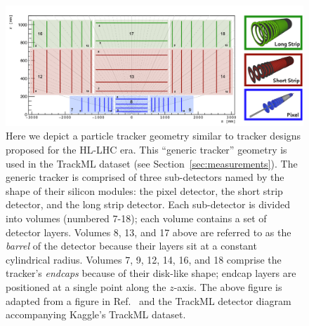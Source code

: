 \documentclass[twocolumn]{svjour3}
\begin{document}
\begin{figure}[!htbp]
\centering
\includegraphics[width=0.99\columnwidth,clip]{pixel_detector.pdf}
\caption{Here we depict a particle tracker geometry similar to tracker designs proposed for the HL-LHC era. 
This ``generic tracker'' geometry is used in the TrackML dataset (see Section~\ref{sec:measurements}). 
The generic tracker is comprised of three sub-detectors named by the shape of their silicon modules: the pixel detector, the short strip detector, and the long strip detector. 
Each sub-detector is divided into volumes (numbered 7-18); each volume contains a set of detector layers. 
Volumes 8, 13, and 17 above are referred to as the \textit{barrel} of the detector because their layers sit at a constant cylindrical radius. 
Volumes 7, 9, 12, 14, 16, and 18 comprise the tracker's \textit{endcaps} because of their disk-like shape; endcap layers are positioned at a single point along the $z$-axis. 
The above figure is adapted from a figure in Ref.~\cite{TrackML} and the TrackML detector diagram accompanying Kaggle's TrackML dataset.}
\label{fig:pixel} 
\end{figure}
\end{document}
